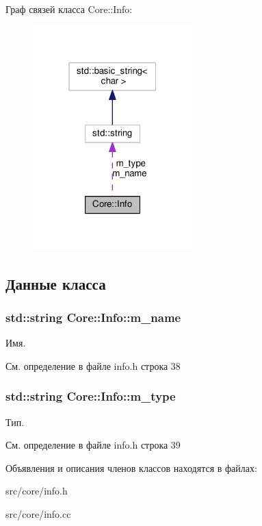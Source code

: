 Граф связей класса Core\+:\+:Info\+:
\nopagebreak
\begin{figure}[H]
\begin{center}
\leavevmode
\includegraphics[width=175pt]{class_core_1_1_info__coll__graph}
\end{center}
\end{figure}


\subsection{Данные класса}
\subsubsection[{\texorpdfstring{m\+\_\+name}{m_name}}]{\setlength{\rightskip}{0pt plus 5cm}std\+::string Core\+::\+Info\+::m\+\_\+name\hspace{0.3cm}{\ttfamily [private]}}\hypertarget{class_core_1_1_info_a027464b5db2e89c6c2f48faf99d25b22}{}\label{class_core_1_1_info_a027464b5db2e89c6c2f48faf99d25b22}
Имя. 

См. определение в файле info.\+h строка 38

\subsubsection[{\texorpdfstring{m\+\_\+type}{m_type}}]{\setlength{\rightskip}{0pt plus 5cm}std\+::string Core\+::\+Info\+::m\+\_\+type\hspace{0.3cm}{\ttfamily [private]}}\hypertarget{class_core_1_1_info_aa5d089f59122826625d6dd68af47775e}{}\label{class_core_1_1_info_aa5d089f59122826625d6dd68af47775e}
Тип. 

См. определение в файле info.\+h строка 39



Объявления и описания членов классов находятся в файлах\+:\begin{DoxyCompactItemize}
\item 
src/core/info.\+h\item 
src/core/info.\+cc\end{DoxyCompactItemize}
